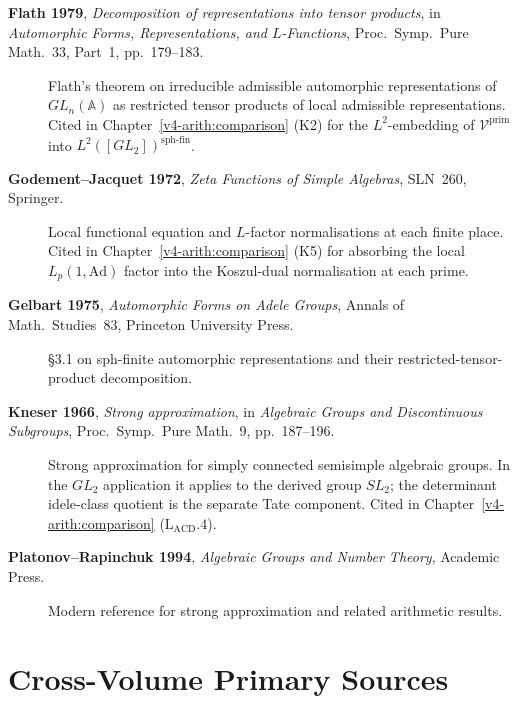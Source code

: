 \begin{description}
\item[\textbf{Flath 1979}, \emph{Decomposition of representations
into tensor products}, in \emph{Automorphic Forms, Representations,
and \(L\)-Functions}, Proc.~Symp.~Pure Math.~33, Part~1,
pp.~179--183.] Flath's theorem on irreducible admissible
automorphic representations of \(GL_{n}(\mathbb{A})\) as restricted
tensor products of local admissible representations. Cited in
Chapter~\ref{v4-arith:comparison}
 (K2) for the \(L^{2}\)-embedding of
\(\mathcal{V}^{\mathrm{prim}}\) into \(L^{2}([GL_{2}])^{\mathrm{sph\text{-}fin}}\).
\item[\textbf{Godement--Jacquet 1972}, \emph{Zeta Functions of
Simple Algebras}, SLN~260, Springer.] Local functional equation
and \(L\)-factor normalisations at each finite place. Cited in
Chapter~\ref{v4-arith:comparison}
 (K5) for absorbing the local
\(L_{p}(1,\mathrm{Ad})\) factor into the Koszul-dual
normalisation at each prime.
\item[\textbf{Gelbart 1975}, \emph{Automorphic Forms on Adele
Groups}, Annals of Math.~Studies~83, Princeton University Press.]
\S3.1 on sph-finite automorphic representations and their
restricted-tensor-product decomposition.
\item[\textbf{Kneser 1966}, \emph{Strong approximation}, in
\emph{Algebraic Groups and Discontinuous Subgroups}, Proc.~Symp.~Pure
Math.~9, pp.~187--196.] Strong approximation for simply connected
semisimple algebraic groups. In the \(GL_{2}\) application it applies
to the derived group \(SL_{2}\); the determinant idele-class quotient
is the separate Tate component. Cited in
Chapter~\ref{v4-arith:comparison}
 (\(\mathrm{L}_{\mathrm{ACD}}.4\)).
\item[\textbf{Platonov--Rapinchuk 1994}, \emph{Algebraic Groups and
Number Theory}, Academic Press.] Modern reference for strong
approximation and related arithmetic results.
\end{description}


\section{Cross-Volume Primary Sources}
\label{v4-arith:app:A:cross-volume}

